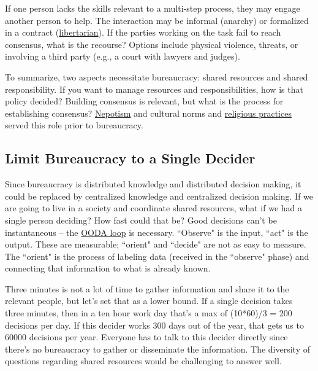 If one person lacks the skills relevant to a multi-step process, they may engage another person to help. The interaction may be informal (anarchy) or formalized in a contract (\href{https://en.wikipedia.org/wiki/Libertarianism}{libertarian}). If the parties working on the task fail to reach consensus, what is the recourse? Options include physical violence, threats, or involving a third party (e.g., a court with lawyers and judges). 


To summarize, two aspects necessitate bureaucracy: shared resources and shared responsibility. 
If you want to manage resources and responsibilities, how is that policy decided?  Building consensus is relevant, but what is the process for establishing consensus? \href{https://en.wikipedia.org/wiki/Nepotism}{Nepotism} and cultural norms and \href{https://en.wikipedia.org/wiki/Religion}{religious practices} served this role prior to bureaucracy. 


\subsection{Limit Bureaucracy to a Single Decider\label{sec:single-decider}}

Since bureaucracy is distributed knowledge and distributed decision making, it could be replaced by centralized knowledge and centralized decision making. If we are going to live in a society and coordinate shared resources, what if we had a single person deciding? How fast could that be? Good decisions can't be instantaneous -- the \href{https://en.wikipedia.org/wiki/OODA_loop}{OODA loop} is necessary. 
``Observe" is the input, ``act" is the output. These are measurable; ``orient" and ``decide" are not as easy to measure. The ``orient" is the process of labeling data (received in the ``observe" phase) and connecting that information to what is already known.

Three minutes is not a lot of time to gather information and share it to the relevant people, but let's set that as a lower bound.
If a single decision takes three minutes, then in a ten hour work day that's a max of (10*60)/3 = 200 decisions per day. If this decider works 300 days out of the year, that gets us to 60000 decisions per year. Everyone has to talk to this decider directly since there's no bureaucracy to gather or disseminate the information. The diversity of questions regarding shared resources would be challenging to answer well.

